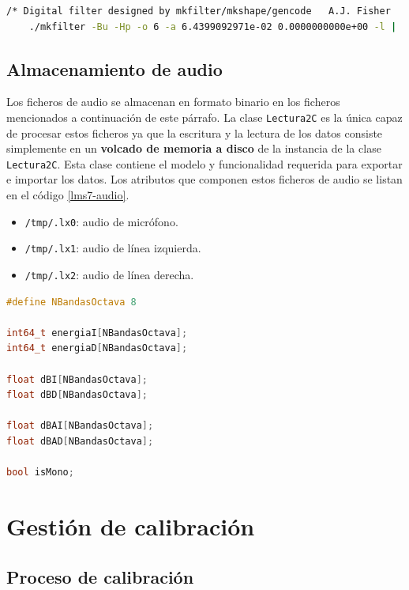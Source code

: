 \begin{lstlisting}[language=bash, caption={Generación de filtros con \texttt{mkfilter}.}, label={lst:lms7-mkfilter}]
	/* Digital filter designed by mkfilter/mkshape/gencode   A.J. Fisher
	./mkfilter -Bu -Hp -o 6 -a 6.4399092971e-02 0.0000000000e+00 -l | ./gencode
\end{lstlisting}

\subsection{Almacenamiento de audio}

Los ficheros de audio se almacenan en formato binario en los ficheros mencionados a continuación de este párrafo. La clase \verb|Lectura2C| es la única capaz de procesar estos ficheros ya que la escritura y la lectura de los datos consiste simplemente en un \textbf{volcado de memoria a disco} de la instancia de la clase \verb|Lectura2C|. Esta clase contiene el modelo y funcionalidad requerida para exportar e importar los datos. Los atributos que componen estos ficheros de audio se listan en el código \ref{lms7-audio}.

\begin{itemize}
	 \item \verb|/tmp/.lx0|: audio de micrófono.
	 \item \verb|/tmp/.lx1|: audio de línea izquierda.
	 \item \verb|/tmp/.lx2|: audio de línea derecha.
\end{itemize}

\begin{lstlisting}[language=c++, label={lms7-audio}, caption={Datos miembro de la clase Lectura2C.}]
#define NBandasOctava 8

int64_t energiaI[NBandasOctava];
int64_t energiaD[NBandasOctava];

float dBI[NBandasOctava];
float dBD[NBandasOctava];

float dBAI[NBandasOctava];
float dBAD[NBandasOctava];

bool isMono;
\end{lstlisting}


\section{Gestión de calibración}

\subsection{Proceso de calibración} \label{sec:lms7-calibrar}

